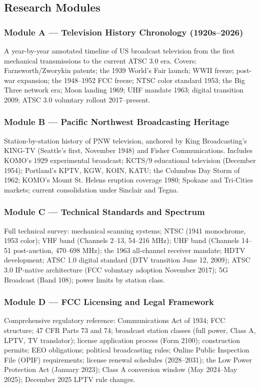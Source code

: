 \documentclass[11pt,letterpaper]{article}
\begin{document}
\subsection{Research Modules}

\subsubsection{Module A --- Television History Chronology (1920s--2026)}
A year-by-year annotated timeline of US broadcast television from the first mechanical transmissions to the current ATSC 3.0 era. Covers: Farnsworth/Zworykin patents; the 1939 World's Fair launch; WWII freeze; post-war expansion; the 1948--1952 FCC freeze; NTSC color standard 1953; the Big Three network era; Moon landing 1969; UHF mandate 1963; digital transition 2009; ATSC 3.0 voluntary rollout 2017--present.

\subsubsection{Module B --- Pacific Northwest Broadcasting Heritage}
Station-by-station history of PNW television, anchored by King Broadcasting's KING-TV (Seattle's first, November 1948) and Fisher Communications. Includes KOMO's 1929 experimental broadcast; KCTS/9 educational television (December 1954); Portland's KPTV, KGW, KOIN, KATU; the Columbus Day Storm of 1962; KOMO's Mount St. Helens eruption coverage 1980; Spokane and Tri-Cities markets; current consolidation under Sinclair and Tegna.

\subsubsection{Module C --- Technical Standards and Spectrum}
Full technical survey: mechanical scanning systems; NTSC (1941 monochrome, 1953 color); VHF band (Channels 2--13, 54--216 MHz); UHF band (Channels 14--51 post-auction, 470--698 MHz); the 1963 all-channel receiver mandate; HDTV development; ATSC 1.0 digital standard (DTV transition June 12, 2009); ATSC 3.0 IP-native architecture (FCC voluntary adoption November 2017); 5G Broadcast (Band 108); power limits by station class.

\subsubsection{Module D --- FCC Licensing and Legal Framework}
Comprehensive regulatory reference: Communications Act of 1934; FCC structure; 47 CFR Parts 73 and 74; broadcast station classes (full power, Class A, LPTV, TV translator); license application process (Form 2100); construction permits; EEO obligations; political broadcasting rules; Online Public Inspection File (OPIF) requirements; license renewal schedules (2028--2031); the Low Power Protection Act (January 2023); Class A conversion window (May 2024--May 2025); December 2025 LPTV rule changes.
\end{document}
